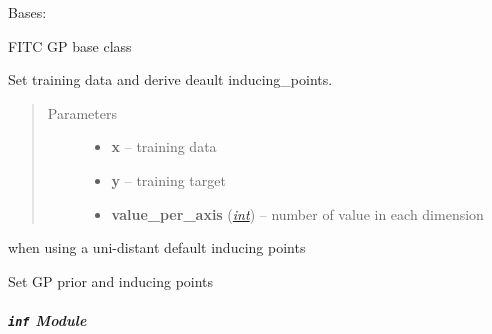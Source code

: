 \documentclass[letterpaper,10pt,english]{sphinxmanual}
\begin{document}
\begin{fulllineitems}
\label{pyGPs.Core:pyGPs.Core.gp.GP_FITC}
Bases: {\hyperref[pyGPs.Core:pyGPs.Core.gp.GP]{}}

FITC GP base class

\begin{fulllineitems}
\label{pyGPs.Core:pyGPs.Core.gp.GP_FITC.setData}
Set training data and derive deault inducing\_points.
\begin{quote}\begin{description}
\item[{Parameters}] \leavevmode\begin{itemize}
\item {} 
\textbf{x} -- training data

\item {} 
\textbf{y} -- training target

\item {} 
\textbf{value\_per\_axis} (\href{http://docs.python.org/library/functions.html\#int}{\emph{int}}) -- number of value in each dimension

\end{itemize}

\end{description}\end{quote}

when using a uni-distant default inducing points

\end{fulllineitems}


\begin{fulllineitems}
\label{pyGPs.Core:pyGPs.Core.gp.GP_FITC.setPrior}
Set GP prior and inducing points

\end{fulllineitems}


\end{fulllineitems}



\subparagraph{\texttt{inf} Module}
\label{pyGPs.Core:inf-module}\label{pyGPs.Core:module-pyGPs.Core.inf}
\end{document}
